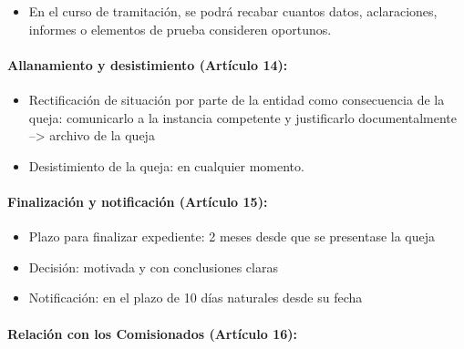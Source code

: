 \documentclass[
]{article}
\providecommand{\tightlist}{%
  \setlength{\itemsep}{0pt}\setlength{\parskip}{0pt}}
\begin{document}
\begin{itemize}
\tightlist
\item
  En el curso de tramitación, se podrá recabar cuantos datos,
  aclaraciones, informes o elementos de prueba consideren oportunos.
\end{itemize}

\hypertarget{allanamiento-y-desistimiento-artuxedculo-14}{%
\paragraph{\texorpdfstring{Allanamiento y desistimiento
(\textbf{Artículo
14}):}{Allanamiento y desistimiento (Artículo 14):}}\label{allanamiento-y-desistimiento-artuxedculo-14}}

\begin{itemize}
\tightlist
\item
  Rectificación de situación por parte de la entidad como consecuencia
  de la queja: comunicarlo a la instancia competente y justificarlo
  documentalmente --\textgreater{} archivo de la queja
\item
  Desistimiento de la queja: en cualquier momento.
\end{itemize}

\hypertarget{finalizaciuxf3n-y-notificaciuxf3n-artuxedculo-15}{%
\paragraph{\texorpdfstring{Finalización y notificación (\textbf{Artículo
15}):}{Finalización y notificación (Artículo 15):}}\label{finalizaciuxf3n-y-notificaciuxf3n-artuxedculo-15}}

\begin{itemize}
\tightlist
\item
  Plazo para finalizar expediente: 2 meses desde que se presentase la
  queja
\item
  Decisión: motivada y con conclusiones claras
\item
  Notificación: en el plazo de 10 días naturales desde su fecha
\end{itemize}

\hypertarget{relaciuxf3n-con-los-comisionados-artuxedculo-16}{%
\paragraph{\texorpdfstring{Relación con los Comisionados
(\textbf{Artículo
16}):}{Relación con los Comisionados (Artículo 16):}}\label{relaciuxf3n-con-los-comisionados-artuxedculo-16}}
\end{document}
